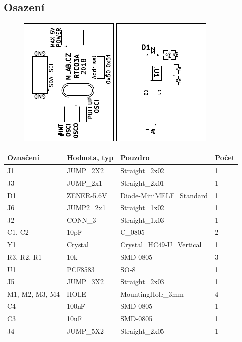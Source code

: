 \subsection{Osazení}


\begin{figure}[ht!]
	\centering
	\includegraphics[scale=2]{../../hw/cam_profi/RTC03A-top_cropped.pdf}
	\qquad
	\includegraphics[scale=2]{../../hw/cam_profi/RTC03A-bottom_cropped.pdf}
\end{figure}

\begin{center}
  \begin{tabular}{ | l | l | l | l |}
    \hline
    Označení & Hodnota, typ & Pouzdro & Počet \\ \hline
    \hline
			J1 & JUMP\_2X2 & Straight\_2x02 & 1\\ \hline
			J3 & JUMP\_2x1 & Straight\_2x01 & 1\\ \hline
			D1 & ZENER-5.6V & Diode-MiniMELF\_Standard & 1\\ \hline
			J6 & JUMP2\_2x1 & Straight\_1x02 & 1\\ \hline
			J2 & CONN\_3 & Straight\_1x03 & 1\\ \hline
			C1, C2 & 10pF & C\_0805 & 2\\ \hline
			Y1 & Crystal & Crystal\_HC49-U\_Vertical & 1\\ \hline
			R3, R2, R1 & 10k & SMD-0805 & 3\\ \hline
			U1 & PCF8583 & SO-8 & 1\\ \hline
			J5 & JUMP\_3X2 & Straight\_2x03 & 1\\ \hline
			M1, M2, M3, M4 & HOLE & MountingHole\_3mm & 4\\ \hline
			C4 & 100nF & SMD-0805 & 1\\ \hline
			C3 & 10uF & SMD-0805 & 1\\ \hline
			J4 & JUMP\_5X2 & Straight\_2x05 & 1\\ \hline
	
  \end{tabular}
\end{center}